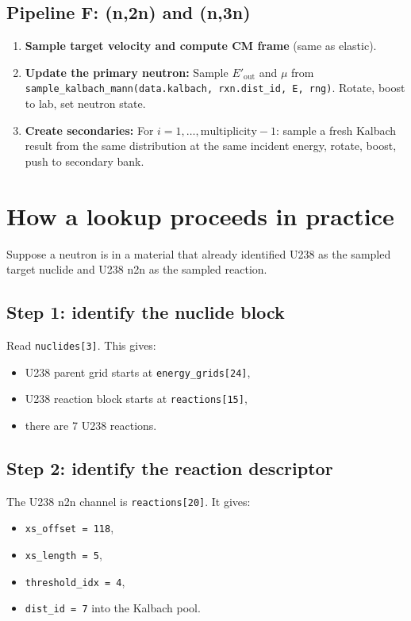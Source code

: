 \documentclass[11pt,a4paper]{article}
\begin{document}
\subsection{Pipeline F: (n,2n) and (n,3n)}

\begin{enumerate}[leftmargin=1.4em]
  \item \textbf{Sample target velocity and compute CM frame} (same as elastic).
  \item \textbf{Update the primary neutron:} Sample $E'_\text{out}$ and $\mu$ from \texttt{sample\_kalbach\_mann(data.kalbach, rxn.dist\_id, E, rng)}. Rotate, boost to lab, set neutron state.
  \item \textbf{Create secondaries:} For $i = 1, \ldots, \text{multiplicity} - 1$: sample a fresh Kalbach result from the same distribution at the same incident energy, rotate, boost, push to secondary bank.
\end{enumerate}

\section{How a lookup proceeds in practice}
Suppose a neutron is in a material that already identified U238 as the sampled target nuclide and U238 n2n as the sampled reaction.

\subsection*{Step 1: identify the nuclide block}
Read \texttt{nuclides[3]}. This gives:
\begin{itemize}[leftmargin=1.4em]
  \item U238 parent grid starts at \texttt{energy\_grids[24]},
  \item U238 reaction block starts at \texttt{reactions[15]},
  \item there are 7 U238 reactions.
\end{itemize}

\subsection*{Step 2: identify the reaction descriptor}
The U238 n2n channel is \texttt{reactions[20]}. It gives:
\begin{itemize}[leftmargin=1.4em]
  \item \texttt{xs\_offset = 118},
  \item \texttt{xs\_length = 5},
  \item \texttt{threshold\_idx = 4},
  \item \texttt{dist\_id = 7} into the Kalbach pool.
\end{itemize}
\end{document}

